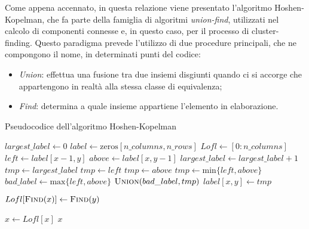 Come appena accennato, in questa relazione viene presentato l'algoritmo 
Hoshen-Kopelman, che fa parte della famiglia di algoritmi \textit{union-find},
utilizzati nel calcolo di componenti connesse e, in questo caso, per il processo 
di cluster-finding. Questo paradigma prevede l'utilizzo di due procedure principali,
che ne compongono il nome, in determinati punti del codice:
\begin{itemize}
    \item \textit{Union}: effettua una fusione tra due insiemi disgiunti quando ci 
    si accorge che appartengono in realtà alla stessa classe di equivalenza;
    \item \textit{Find}: determina a quale insieme appartiene l'elemento in elaborazione.
\end{itemize}

\begin{algorithm}
    \caption{Pseudocodice dell'algoritmo Hoshen-Kopelman}
    \label{alg:HK}
    {\small
    \begin{algorithmic}[1]
    \State $largest\_label \gets 0$
    \State $label \gets \text{zeros}[n\_columns, n\_rows]$
    \State $Lofl \gets [0:n\_columns]$
    \\
    \For{$[x,y] \gets [0,0]$ \textbf{to} $[n\_columns,n\_rows$}
            \State $left \gets label[x-1, y]$
            \State $above \gets label[x, y-1]$
                \State $largest\_label \gets largest\_label + 1$
                \State $tmp \gets largest\_label$
                \State $tmp \gets left$
                \State $tmp \gets above$
            \Else
                \State $tmp \gets \text{min}\{left,above\}$
                \State $bad\_label \gets \text{max}\{left,above\}$
                \State $\Call{Union}{bad\_label, tmp}$
            \EndIf
            \State $label[x,y] \gets tmp$
        \EndIf
    \EndFor
    
    \vspace{5pt}
        \State $Lofl[\Call{Find}{x}] \gets \Call{Find}{y}$
    \EndProcedure

    \vspace{5pt}
            \State $x \gets Lofl[x]$
        \EndWhile
        \State \Return $x$
    \EndFunction
    
    \end{algorithmic}
    }
\end{algorithm}

